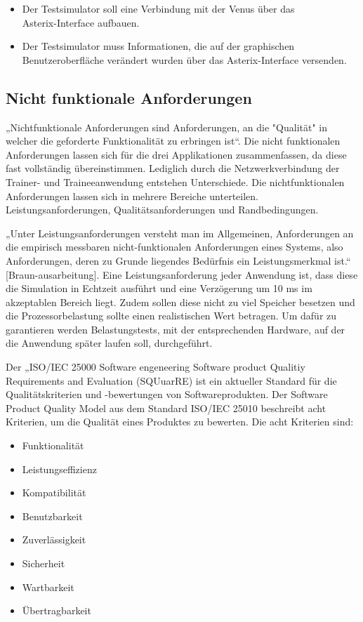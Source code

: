 \begin{itemize}
    \item Der Testsimulator soll eine Verbindung mit der Venus über das \\ Asterix-Interface aufbauen.
    \item Der Testsimulator muss Informationen, die auf der graphischen Benutzeroberfläche verändert wurden über das Asterix-Interface versenden.
\end{itemize}

\subsection{Nicht funktionale Anforderungen}

„Nichtfunktionale Anforderungen sind Anforderungen, an die "Qualität" in welcher die geforderte Funktionalität zu erbringen ist“. Die nicht funktionalen 
Anforderungen lassen sich für die drei Applikationen zusammenfassen, da diese fast vollständig übereinstimmen. Lediglich durch die Netzwerkverbindung der 
Trainer- und Traineeanwendung entstehen Unterschiede. Die nichtfunktionalen Anforderungen lassen sich in mehrere Bereiche unterteilen. 
Leistungsanforderungen, Qualitätsanforderungen und Randbedingungen.

„Unter Leistungsanforderungen versteht man im Allgemeinen, Anforderungen an die empirisch messbaren nicht-funktionalen Anforderungen eines Systems, also 
Anforderungen, deren zu Grunde liegendes Bedürfnis ein Leistungsmerkmal ist.“ [Braun-ausarbeitung]. Eine Leistungsanforderung jeder Anwendung ist, dass 
diese die Simulation in Echtzeit ausführt und eine Verzögerung um 10 ms im akzeptablen Bereich liegt. Zudem sollen diese nicht zu viel Speicher besetzen 
und die Prozessorbelastung sollte einen realistischen Wert betragen. Um dafür zu garantieren werden Belastungstests, mit der entsprechenden Hardware, auf 
der die Anwendung später laufen soll, durchgeführt.

Der „ISO/IEC 25000 Software engeneering Software product Qualitiy Requirements and Evaluation (SQUuarRE) ist ein aktueller Standard für die 
Qualitätskriterien und -bewertungen von Softwareprodukten. Der Software Product Quality Model aus dem Standard ISO/IEC 25010 beschreibt acht Kriterien, 
um die Qualität eines Produktes zu bewerten. Die acht Kriterien sind:
\begin{itemize}
    \item Funktionalität
    \item Leistungseffizienz
    \item Kompatibilität
    \item Benutzbarkeit
    \item Zuverlässigkeit
    \item Sicherheit
    \item Wartbarkeit
    \item Übertragbarkeit    
\end{itemize}

